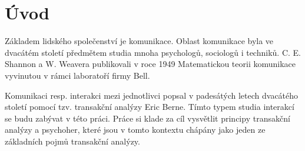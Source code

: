 \chapter{Úvod}

Základem lidského společenství je komunikace. 
Oblast komunikace byla ve dvacátém století předmětem studia mnoha psychologů, sociologů i techniků.
C. E. Shannon a W. Weavera publikovali v roce 1949 Matematickou teorii komunikace vyvinutou v rámci laboratoří firmy Bell. 


Komunikaci resp. interakci mezi jednotlivci popsal v padesátých letech dvacátého století pomocí tzv. transakční analýzy Eric Berne.
Tímto typem studia interakcí se budu zabývat v této práci.
Práce si klade za cíl vysvětlit principy transakční analýzy a psychoher, které jsou v tomto kontextu chápány jako jeden ze základních pojmů transakční analýzy.


